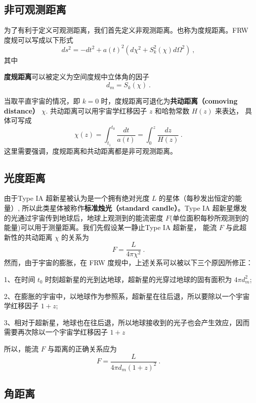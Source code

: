

\subsection{非可观测距离}
为了有利于定义可观测距离，我们首先定义非观测距离。也称为度规距离。FRW 度规可以写成以下形式
\begin{equation}
ds^2=-dt^2+a(t)^2(d\chi^2+S^2_k (\chi) d\Omega^2)~,
\end{equation}
其中
\addTODO{[xxx]}

\textbf{度规距离}可以被定义为空间度规中立体角的因子
\begin{equation}
d_m=S_k(\chi)~.
\end{equation}

当取平直宇宙的情况，即 $k=0$ 时，度规距离可退化为\textbf{共动距离（comoving distance）} $\chi$. 共动距离可以用宇宙学红移因子 $z$ 和哈勃常数 $H(z)$ 来表达， 具体可写成
\begin{equation}
\chi(z)=\int^{t_0}_{t_1} \frac{dt}{a(t)}=\int^z_0 \frac{dz}{H(z)}~.
\end{equation}
这里需要强调，度规距离和共动距离都是非可观测距离。

\subsection{光度距离}
由于Type IA 超新星被认为是一个拥有绝对光度 $L$ 的星体（每秒发出恒定的能量）, 所以此类星体被称作\textbf{标准烛光（standard candle）}。Type IA 超新星爆发的光通过宇宙传到地球后，地球上观测到的能流密度 $F$(单位面积每秒所观测到的能量)可以用于测量距离。我们先假设某一静止Type IA 超新星， 能流 $F$ 与此超新性的共动距离 $\chi$ 的关系为
\begin{equation}
F=\frac{L}{4\pi \chi^2}~.
\end{equation}
然而，由于宇宙的膨胀，在 FRW 度规中，上述关系可以被以下三个原因所修正：

1、在时间 $t_0$ 时刻超新星的光到达地球，超新星的光穿过地球的固有面积为 $4\pi d_m^2$;

2、在膨胀的宇宙中，以地球作为参照系，超新星在往后退，所以要除以一个宇宙学红移因子 $1+z$;

3、相对于超新星，地球也在往后退，所以地球接收到的光子也会产生效应，因而需要再次除以一个宇宙学红移因子 $1+z$

所以，能流 $F$ 与距离的正确关系应为
\begin{equation}
F=\frac{L}{4\pi d_m (1+z)^2}~.
\end{equation}

\subsection{角距离}
